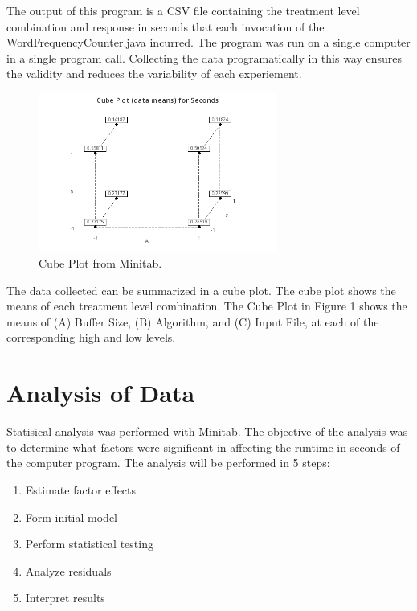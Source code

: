 \documentclass{article}
\begin{document}
  The output of this program is a CSV file containing the treatment level
  combination and response in seconds that each invocation of the WordFrequencyCounter.java incurred.
  The program was run on a single computer in a single program call.
  Collecting the data programatically
  in this way ensures the validity and reduces the variability of each experiement.

  \begin{figure}[h] %
    \centering
    \includegraphics[width=0.7\textwidth]{./images/cube.png}
    \caption{Cube Plot from Minitab.}
    \label{fig:interaction}
  \end{figure}
  The data collected can be summarized in a cube plot.
  The cube plot shows the means of each treatment level combination.
  The Cube Plot in Figure 1 shows the means of (A) Buffer Size, (B) Algorithm, and (C) Input File, at each of the corresponding high and low levels.

\clearpage
\section{Analysis of Data}

  Statisical analysis was performed with Minitab.
  The objective of the analysis was to determine what factors were
  significant in affecting the runtime in seconds of the computer program.
  The analysis will be performed in 5 steps:
  \begin{enumerate}
    \item Estimate factor effects
    \item Form initial model
    \item Perform statistical testing
    \item Analyze residuals
    \item Interpret results
  \end{enumerate}
\end{document}
